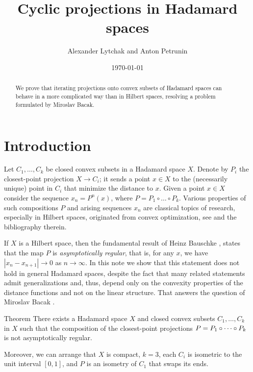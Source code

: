 \documentclass[a4paper,10pt]{article}
\def\thetitle{Cyclic projections in Hadamard spaces}
\def\theauthors{Alexander Lytchak and Anton Petrunin}
\begin{document}
\title{\thetitle}	
\author{\theauthors}
\date{\today}
\maketitle

\begin{abstract}
	We  prove that iterating projections onto convex subsets of Hadamard spaces can behave in a more complicated way than in Hilbert spaces, resolving a problem formulated by Miroslav Bacak. 	
\end{abstract}


\section{Introduction}


Let  $C_1,\dots, C_k$ be closed convex subsets in a Hadamard space $X$.
Denote by $P_i$ the closest-point projection $X\to C_i$; it sends a point $x\in X$ to the (necessarily unique) point in $C_i$ that minimize the distance to $x$.
Given a point $x\in X$ consider the sequence $x_n=P^n(x)$, where
$P= P_1\circ \dots \circ P_k$.
Various properties of such compositions  $P$ and arising  sequences $x_n$
are classical topics of research, especially in Hilbert spaces, originated from convex optimization, see \cite{Bac, Bac2, Bauschke, bauschke-borwein-lewis,deutsch-hundal}
and the bibliography therein.

If $X$ is a Hilbert space, then the fundamental result of Heinz Bauschke \cite{Bauschke,Kohlenbach}, states that the map $P$ is \emph{asymptotically regular}, that is, for any $x$, we have  $|x_n-x_{n+1}|\to 0$ as $n\to \infty$.
In this note we show that this statement does not hold in general Hadamard spaces, despite the fact that many related statements
admit generalizations and, thus, depend only on the convexity properties of the distance functions and not on the linear structure. 
That answers the question of Miroslav Bacak \cite[Problem 6.13]{Bac}.

\begin{thm}{Theorem}\label{thm}
There exists a Hadamard space $X$ and closed convex subsets $C_1,\dots,C_k$ in $X$ such that the composition of the closest-point projections $P\z= P_1\circ \dots \circ P_k$ is not asymptotically regular.

Moreover, we can arrange that $X$ is compact, $k=3$, each $C_i$ is isometric to the unit interval $[0,1]$, 
and $P$ is an isometry of $C_1$ that swaps its ends.
\end{thm}
\end{document}
